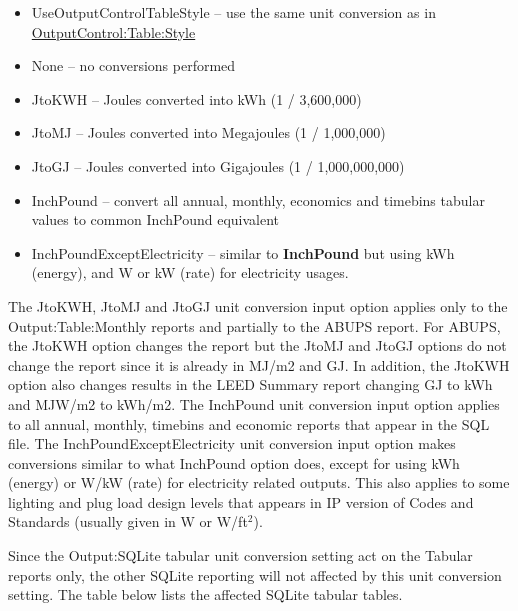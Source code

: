 \begin{itemize}
\item
UseOutputControlTableStyle -- use the same unit conversion as in \hyperref[outputcontroltablestyle]{OutputControl:Table:Style}

\item
None -- no conversions performed
\item
JtoKWH -- Joules converted into kWh (1 / 3,600,000)
\item
JtoMJ -- Joules converted into Megajoules (1 / 1,000,000)
\item
JtoGJ -- Joules converted into Gigajoules (1 / 1,000,000,000)
\item
InchPound -- convert all annual, monthly, economics and timebins tabular values to common InchPound equivalent
\item
InchPoundExceptElectricity -- similar to \textbf{InchPound} but using kWh (energy), and W or kW (rate) for electricity usages.
\end{itemize}

The JtoKWH, JtoMJ and JtoGJ unit conversion input option applies only to the Output:Table:Monthly reports and partially to the ABUPS report. For ABUPS, the JtoKWH option changes the report but the JtoMJ and JtoGJ options do not change the report since it is already in MJ/m2 and GJ. In addition, the JtoKWH option also changes results in the LEED Summary report changing GJ to kWh and MJW/m2 to kWh/m2. The InchPound unit conversion input option applies to all annual, monthly, timebins and economic reports that appear in the SQL file. The InchPoundExceptElectricity unit conversion input option makes conversions similar to what InchPound option does, except for using kWh (energy) or W/kW (rate) for electricity related outputs. This also applies to some lighting and plug load design levels that appears in IP version of Codes and Standards (usually given in W or W/ft$^2$).

Since the Output:SQLite tabular unit conversion setting act on the Tabular reports only, the other SQLite reporting will not affected by this unit conversion setting. The table below lists the affected SQLite tabular tables.

